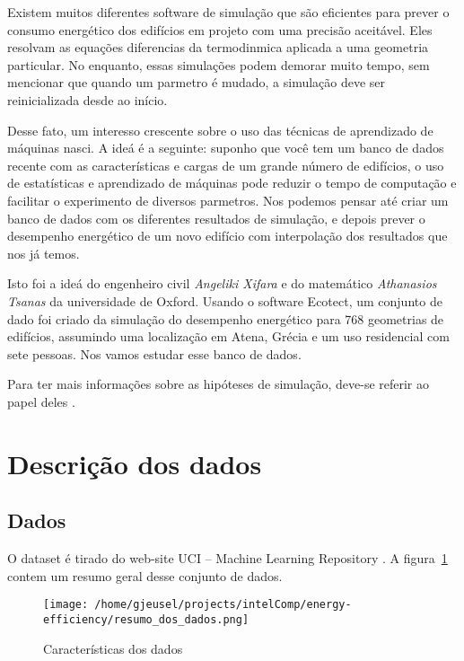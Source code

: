 \documentclass[paper=a4, fontsize=11pt]{article} %
\numberwithin{equation}{section} %
\numberwithin{figure}{section} %
\numberwithin{table}{section} %
\begin{document}
Existem muitos diferentes software de simulação que são eficientes para prever o consumo energético dos edifícios em projeto com uma precisão aceitável.
Eles resolvam as equações diferencias da termodinmica aplicada a uma geometria particular.
No enquanto, essas simulações podem demorar muito tempo, sem mencionar que quando um parmetro é mudado, a simulação deve ser reinicializada desde ao início.

Desse fato, um interesso crescente sobre o uso das técnicas de aprendizado de máquinas nasci.
A ideá é a seguinte: suponho que você tem um banco de dados recente com as características e cargas de um grande número de edifícios,
o uso de estatísticas e aprendizado de máquinas pode reduzir o tempo de computação e facilitar o experimento de diversos parmetros.
Nos podemos pensar até criar um banco de dados com os diferentes resultados de simulação,
e depois prever o desempenho energético de um novo edifício com interpolação dos resultados que nos já temos.

Isto foi a ideá do engenheiro civil \emph{Angeliki Xifara} e do matemático \emph{Athanasios Tsanas} da universidade de Oxford.
Usando o software Ecotect, um conjunto de dado foi criado da simulação do desempenho energético para 768 geometrias de edifícios,
assumindo uma localização em Atena, Grécia e um uso residencial com sete pessoas.
Nos vamos estudar esse banco de dados.

Para ter mais informações sobre as hipóteses de simulação, deve-se referir ao papel deles \cite{ref_Athanasios}.



\section{Descrição dos dados}

\subsection{Dados}
O dataset é tirado do web-site UCI – Machine Learning Repository \cite{ref_UCI}.
A figura~\ref{dados_resumo} contem um resumo geral desse conjunto de dados.

\begin{figure}[H] %
\begin{center}
\texttt{[image: /home/gjeusel/projects/intelComp/energy-efficiency/resumo\_dos\_dados.png]}
\end{center}
\caption{Características dos dados}
\label{dados_resumo}
\end{figure}
\end{document}
